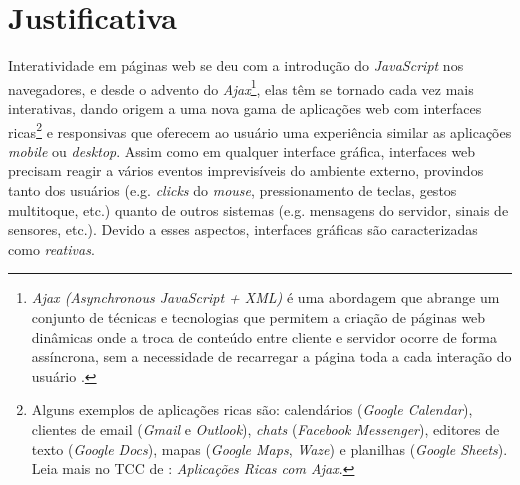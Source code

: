 \section{Justificativa}\label{ljustificativa}

Interatividade em páginas web se deu com a
introdução do \emph{JavaScript} nos navegadores,
e desde o advento do \emph{Ajax}\footnote{
  \emph{Ajax (Asynchronous JavaScript + XML)} é uma
  abordagem que abrange um conjunto de técnicas e
  tecnologias que permitem a criação de páginas web
  dinâmicas onde a troca de conteúdo entre cliente e
  servidor ocorre de forma assíncrona, sem a necessidade
  de recarregar a página toda a cada interação do
  usuário \cite{garrett2005ajax}.
},
elas têm se tornado cada vez mais interativas,
dando origem a uma nova gama de aplicações web com interfaces
ricas\footnote{
  Alguns exemplos de aplicações ricas são:
  calendários (\emph{Google Calendar}),
  clientes de email (\emph{Gmail} e \emph{Outlook}),
  \emph{chats} (\emph{Facebook Messenger}),
  editores de texto (\emph{Google Docs}),
  mapas (\emph{Google Maps}, \emph{Waze}) e
  planilhas (\emph{Google Sheets}).
  Leia mais no TCC de :
  \emph{Aplicações Ricas com Ajax}.
} e responsivas que oferecem ao usuário uma experiência
similar as aplicações \emph{mobile} ou \emph{desktop}.
Assim como em qualquer interface gráfica, interfaces web
precisam reagir a vários eventos imprevisíveis do ambiente
externo, provindos tanto dos usuários (e.g. \emph{clicks}
do \emph{mouse}, pressionamento de teclas, gestos multitoque,
etc.) quanto de outros sistemas (e.g. mensagens do servidor,
sinais de sensores, etc.).
Devido a esses aspectos, interfaces gráficas são caracterizadas
como \emph{reativas}.

